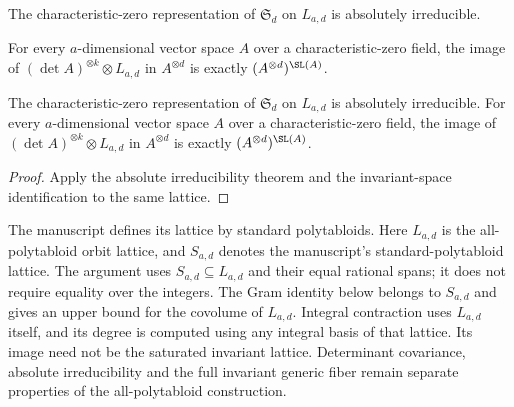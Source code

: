 \begin{theorem}
\label{lem:rectangular-absolute-irreducible}
\notready
The characteristic-zero representation of $\mathfrak S_d$ on
$L_{a,d}$ is absolutely irreducible.
\end{theorem}

\begin{theorem}
\label{lem:rectangular-sl-invariants}
\notready
For every $a$-dimensional vector space $A$ over a characteristic-zero
field, the image of $(\det A)^{\otimes k}\otimes L_{a,d}$ in
$A^{\otimes d}$ is exactly $(A^{\otimes d})^{\SL(A)}$.
\end{theorem}

\begin{theorem}
\label{lem:rectangular-invariants}
\notready
The characteristic-zero representation of $\mathfrak S_d$ on $L_{a,d}$ is
absolutely irreducible. For every $a$-dimensional vector space $A$
over a characteristic-zero field, the image of
$(\det A)^{\otimes k}\otimes L_{a,d}$ in $A^{\otimes d}$ is exactly
$(A^{\otimes d})^{\SL(A)}$.
\end{theorem}
\begin{proof}
Apply the absolute irreducibility theorem and the invariant-space
identification to the same lattice.
\end{proof}

\begin{remark}
The manuscript defines its lattice by standard polytabloids. Here
$L_{a,d}$ is the all-polytabloid orbit lattice, and $S_{a,d}$ denotes
the manuscript's standard-polytabloid lattice. The argument uses
$S_{a,d}\subseteq L_{a,d}$ and their equal rational spans; it does
not require equality over the integers. The Gram identity below
belongs to $S_{a,d}$ and gives an upper bound for the covolume of
$L_{a,d}$. Integral contraction uses $L_{a,d}$ itself, and its degree
is computed using any integral basis of that lattice. Its image
need not be the saturated invariant lattice. Determinant covariance,
absolute irreducibility and the full invariant generic fiber remain
separate properties of the all-polytabloid construction.
\end{remark}

